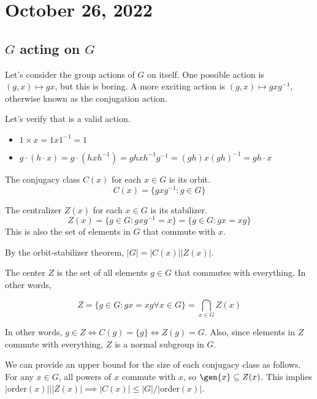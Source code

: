 \section{October 26, 2022}

\subsection{$G$ acting on $G$}

Let's consider the group actions of $G$ on itself. One possible action is $(g, x)\mapsto gx$, but this is boring. A more exciting action is $(g, x)\mapsto gxg^{-1}$, otherwise known as the conjugation action. 

Let's verify that is a valid action. 
\begin{itemize}
    \item $1\times x = 1x1^{-1} = 1$
    \item $g\cdot (h\cdot x) = g\cdot (hxh^{-1}) = ghxh^{-1}g^{-1} = (gh)x(gh)^{-1} = gh\cdot x$
\end{itemize}

\begin{definition}

The \ac{conjugacy class} $C(x)$ for each $x\in G$ is its orbit.
\[C(x) = \{gxg^{-1} : g\in G\}\]
\end{definition}

\begin{definition}

The \ac{centralizer} $Z(x)$ for each $x\in G$ is its stabilizer. 
\[Z(x) = \{g\in G: gxg^{-1} = x\} = \{g\in G : gx = xg\}\]
This is also the set of elements in $G$ that commute with $x$. 
\end{definition}

By the orbit-stabilizer theorem, $\vert G\vert = \vert C(x)\vert \vert Z(x)\vert$. 

\begin{definition}

The \ac{center} $Z$ is the set of all elements $g\in G$ that commutes with everything. In other words, 

\[Z = \{g\in G: gx = xg \forall x\in G\} = \bigcap_{x\in G}Z(x)\]
\end{definition}

In other words, $g\in Z\iff C(g) = \{g\}\iff Z(g) = G$. Also, since elements in $Z$ commute with everything, $Z$ is a normal subgroup in $G$. 

We can provide an upper bound for the size of each conjugacy class as follows. For any $x\in G$, all powers of $x$ commute with $x$, so $\gen{x}\subseteq Z(x)$. This implies $\vert \text{order}(x)\vert \mid \vert Z(x)\vert \implies \vert C(x)\vert \leq \vert G\vert / \vert \text{order}(x)\vert$.

